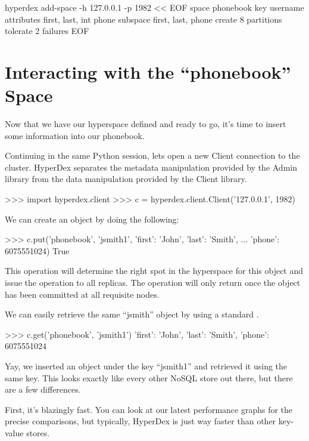 \begin{consolecode}
hyperdex add-space -h 127.0.0.1 -p 1982 << EOF
   space phonebook
   key username
   attributes first, last, int phone
   subspace first, last, phone
   create 8 partitions
   tolerate 2 failures
EOF
\end{consolecode}

\section{Interacting with the ``phonebook'' Space}
\label{sec:quick-start:phonebook}

Now that we have our hyperspace defined and ready to go, it's time to insert
some information into our phonebook.

Continuing in the same Python session, lets open a new Client connection to the
cluster.  HyperDex separates the metadata manipulation provided by the Admin
library from the data manipulation provided by the Client library.

\begin{pythoncode}
>>> import hyperdex.client
>>> c = hyperdex.client.Client('127.0.0.1', 1982)
\end{pythoncode}

We can create an object by doing the following:

\begin{pythoncode}
>>> c.put('phonebook', 'jsmith1', {'first': 'John', 'last': 'Smith',
...                                'phone': 6075551024})
True
\end{pythoncode}

This operation will determine the right spot in the hyperspace for this object
and issue the  operation to all replicas.  The operation will only
return once the object has been committed at all requisite nodes.

We can easily retrieve the same ``jsmith'' object by using a standard
.

\begin{pythoncode}
>>> c.get('phonebook', 'jsmith1')
{'first': 'John', 'last': 'Smith', 'phone': 6075551024}
\end{pythoncode}

Yay, we inserted an object under the key ``jsmith1'' and retrieved it using the
same key.  This looks exactly like every other NoSQL store out there, but there
are a few differences.

First, it's blazingly fast. You can look at our latest performance graphs for
the precise comparisons, but typically, HyperDex is just way faster than other
key-value stores.

